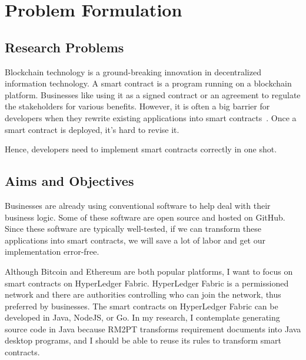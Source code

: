 \chapter{Problem Formulation}

\section{Research Problems}

Blockchain technology is a ground-breaking innovation in decentralized information technology.
A smart contract is a program running on a blockchain platform.
Businesses like using it as a signed contract or an agreement to regulate the stakeholders for various benefits.
However, it is often a big barrier for developers when they rewrite existing applications into smart contracts~\cite{dao2019challenges}.
Once a smart contract is deployed, it's hard to revise it.

Hence, developers need to implement smart contracts correctly in one shot.





\section{Aims and Objectives}

Businesses are already using conventional software to help deal with their business logic.
Some of these software are open source and hosted on GitHub.
Since these software are typically well-tested, if we can transform these applications into smart contracts, we will save a lot of labor and get our implementation error-free.

Although Bitcoin and Ethereum are both popular platforms, I want to focus on smart contracts on HyperLedger Fabric.
HyperLedger Fabric is a permissioned network and there are authorities controlling who can join the network, thus preferred by businesses.
The smart contracts on HyperLedger Fabric can be developed in Java, NodeJS, or Go.
In my research, I contemplate generating source code in Java because RM2PT transforms requirement documents into Java desktop programs,
and I should be able to reuse its rules to transform smart contracts.

